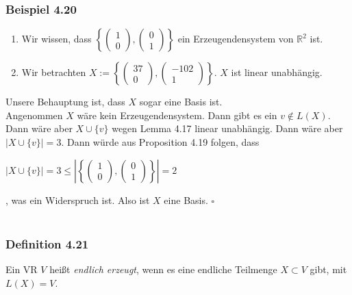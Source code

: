 \documentclass{article}
\begin{document}
\subsubsection*{Beispiel 4.20}
\begin{enumerate}
    \item Wir wissen, dass $\left\{\begin{pmatrix}
        1 \\
        0
    \end{pmatrix}, \begin{pmatrix}
        0 \\
        1
    \end{pmatrix} \right\}$ ein Erzeugendensystem von $\mathbb{R}^2$ ist. \\
    \item Wir betrachten $X := \left\{ \begin{pmatrix}
        37 \\
        0 
    \end{pmatrix}, \begin{pmatrix}
        -102 \\
        1
    \end{pmatrix} \right\}$. $X$ ist linear unabhängig. \\
\end{enumerate}
Unsere Behauptung ist, dass $X$ sogar eine Basis ist. \\
Angenommen $X$ wäre kein Erzeugendensystem. Dann gibt es ein $v \notin L(X)$. 
Dann wäre aber $X \cup \{v\}$ wegen Lemma 4.17 linear unabhängig. Dann wäre aber $|X \cup \{v\}| = 3$. Dann würde aus Proposition 4.19 folgen, dass \\
\begin{center}
    $|X \cup \{v\}| = 3 \leq |\left\{ \begin{pmatrix}
        1\\
        0
    \end{pmatrix}, \begin{pmatrix}
        0 \\
        1
    \end{pmatrix} \right\}| = 2$ \\
\end{center}
, was ein Widerspruch ist. Also ist $X$ eine Basis. $\square$ \\
\\
\subsubsection*{Definition 4.21}
Ein VR $V$ heißt \textit{endlich erzeugt}, wenn es eine endliche Teilmenge $X \subset V$ gibt, mit $L(X) = V$. \\
\\
\end{document}
